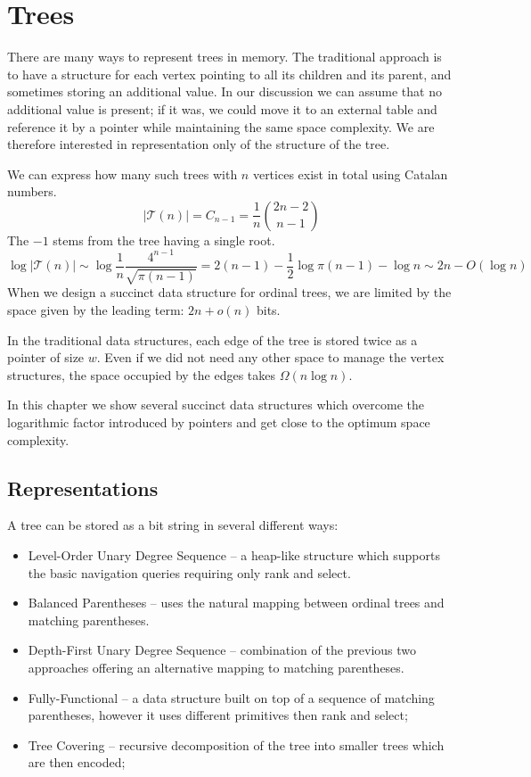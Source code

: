 \chapter{Trees}

There are many ways to represent trees in memory.
The traditional approach is to have a structure for each vertex pointing to all its children and its parent, and sometimes storing an additional value.
In our discussion we can assume that no additional value is present; if it was, we could move it to an external table and reference it by a pointer while maintaining the same space complexity.
We are therefore interested in representation only of the structure of the tree.

We can express how many such trees with $n$ vertices exist in total using Catalan numbers.
$$ | \mathcal{T}(n) | = C_{n-1} = \frac{1}{n} {2n - 2 \choose n - 1} $$
The $-1$ stems from the tree having a single root.
$$ \log | \mathcal{T}(n) | \sim \log \frac{1}{n}\frac{4^{n-1}}{\sqrt{\pi (n-1)}} = 2(n-1) - \frac{1}{2} \log{\pi (n - 1)} - \log n \sim 2n - O(\log n) $$
When we design a succinct data structure for ordinal trees, we are limited by the space given by the leading term: $2n + o(n)$ bits.

In the traditional data structures, each edge of the tree is stored twice as a pointer of size $w$.
Even if we did not need any other space to manage the vertex structures, the space occupied by the edges takes $\Omega (n \log n)$.

In this chapter we show several succinct data structures which overcome the logarithmic factor introduced by pointers and get close to the optimum space complexity.

\section{Representations}

A tree can be stored as a bit string in several different ways:
\begin{itemize}
	\item Level-Order Unary Degree Sequence -- a heap-like structure which supports the basic navigation queries requiring only rank and select.
	\item Balanced Parentheses -- uses the natural mapping between ordinal trees and matching parentheses.
	\item Depth-First Unary Degree Sequence -- combination of the previous two approaches offering an alternative mapping to matching parentheses.
	\item Fully-Functional -- a data structure built on top of a sequence of matching parentheses, however it uses different primitives then rank and select;
	\item Tree Covering -- recursive decomposition of the tree into smaller trees which are then encoded;
\end{itemize}

